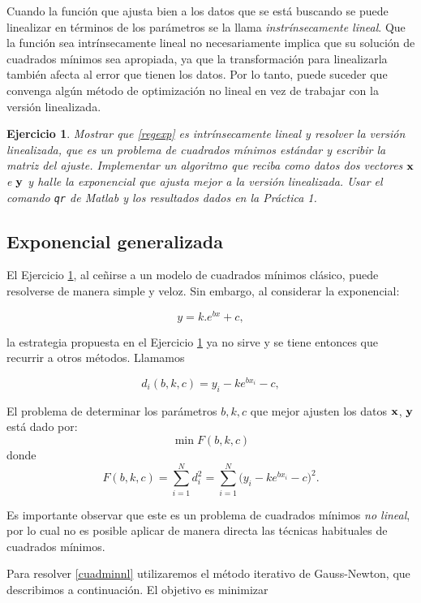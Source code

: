 \documentclass[12pt]{article}
\newtheorem{ejer}{Ejercicio}
\newcommand{\bej}{\begin{ejer}\rm}
\newcommand{\fej}{\end{ejer}}
\begin{document}
Cuando la función que ajusta bien a los datos que se está buscando se puede linealizar en términos de los parámetros se la llama \emph{instrínsecamente lineal}. Que la función sea intrínsecamente lineal no necesariamente implica que su solución de cuadrados mínimos sea apropiada, ya que la transformación para linealizarla también afecta al error que tienen los datos. Por lo tanto, puede suceder que convenga algún método de optimización no lineal en vez de trabajar con la versión linealizada. \cite{Kutner}


\bej\label{ejcuadmin} Mostrar que \eqref{regexp} es intrínsecamente lineal y resolver la versión linealizada,
que es un problema de cuadrados mínimos estándar y escribir la matriz del ajuste. Implementar un algoritmo que reciba como datos dos vectores ${\bf x}$ e ${\bf y}$ y halle la exponencial que ajusta mejor a la versión linealizada. Usar el comando \verb+qr+ de Matlab y los resultados dados en la Práctica 1.\fej 




\subsection*{Exponencial generalizada}

El Ejercicio \ref{ejcuadmin}, al ceñirse a un modelo de cuadrados mínimos clásico, puede resolverse de manera simple y veloz. Sin embargo, al considerar la exponencial:

$$
y = k.e^{bx} + c,
$$

la estrategia propuesta en el Ejercicio \ref{ejcuadmin} ya no sirve y se tiene entonces que recurrir a otros métodos. Llamamos

 $$d_i(b,k,c) =  y_i - ke^{bx_i} - c,$$

  El problema de determinar los parámetros $b,k,c$ que mejor ajusten los datos ${\bf x}$, ${\bf y}$ está dado por:
 \begin{equation}\label{cuadminnl}
 \min F(b,k,c)
 \end{equation}
donde 
$$ F(b,k,c) = \sum_{i=1}^N d_i^2 = \sum_{i=1}^N\Big(y_i - ke^{bx_i} - c\Big)^2.$$

Es importante observar que este es un problema de cuadrados mínimos \emph{no lineal}, por lo cual no es posible aplicar de manera directa las técnicas habituales de cuadrados mínimos. 




Para resolver \eqref{cuadminnl} utilizaremos el método iterativo de Gauss-Newton, que describimos a continuación.
El objetivo es minimizar 
\end{document}
